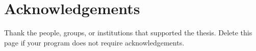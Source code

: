 
\chapter*{Acknowledgements}

Thank the people, groups, or institutions that supported the thesis. Delete
this page if your program does not require acknowledgements.
